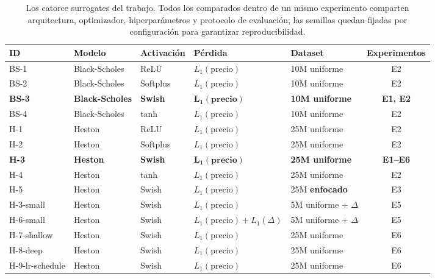 \documentclass[11pt,a4paper]{article}
\begin{document}
\begin{table}[ht]
\centering
\small
\renewcommand{\arraystretch}{1.15}
\begin{tabular}{lllllc}
\toprule
ID & Modelo & Activación & Pérdida & Dataset & Experimentos \\
\midrule
BS-1 & Black-Scholes & ReLU      & $L_1(\text{precio})$ & 10M uniforme & E2 \\
BS-2 & Black-Scholes & Softplus  & $L_1(\text{precio})$ & 10M uniforme & E2 \\
\textbf{BS-3} & \textbf{Black-Scholes} & \textbf{Swish} & $\boldsymbol{L_1(\text{precio})}$ & \textbf{10M uniforme} & \textbf{E1, E2} \\
BS-4 & Black-Scholes & tanh      & $L_1(\text{precio})$ & 10M uniforme & E2 \\
H-1  & Heston        & ReLU      & $L_1(\text{precio})$ & 25M uniforme & E2 \\
H-2  & Heston        & Softplus  & $L_1(\text{precio})$ & 25M uniforme & E2 \\
\textbf{H-3} & \textbf{Heston} & \textbf{Swish} & $\boldsymbol{L_1(\text{precio})}$ & \textbf{25M uniforme} & \textbf{E1--E6} \\
H-4  & Heston        & tanh      & $L_1(\text{precio})$ & 25M uniforme & E2 \\
H-5  & Heston        & Swish     & $L_1(\text{precio})$ & 25M \textbf{enfocado} & E3 \\
H-3-small & Heston   & Swish     & $L_1(\text{precio})$ & 5M uniforme + $\Delta$ & E5 \\
H-6-small & Heston   & Swish     & $L_1(\text{precio}) + L_1(\Delta)$ & 5M uniforme + $\Delta$ & E5 \\
H-7-shallow     & Heston        & Swish     & $L_1(\text{precio})$ & 25M uniforme & E6 \\
H-8-deep        & Heston        & Swish     & $L_1(\text{precio})$ & 25M uniforme & E6 \\
H-9-lr-schedule & Heston        & Swish     & $L_1(\text{precio})$ & 25M uniforme & E6 \\
\bottomrule
\end{tabular}
\caption{Los catorce surrogates del trabajo. Todos los comparados dentro de un mismo experimento comparten arquitectura, optimizador, hiperparámetros y protocolo de evaluación; las semillas quedan fijadas por configuración para garantizar reproducibilidad.}
\label{tab:surrogates}
\end{table}

 
\end{document}
